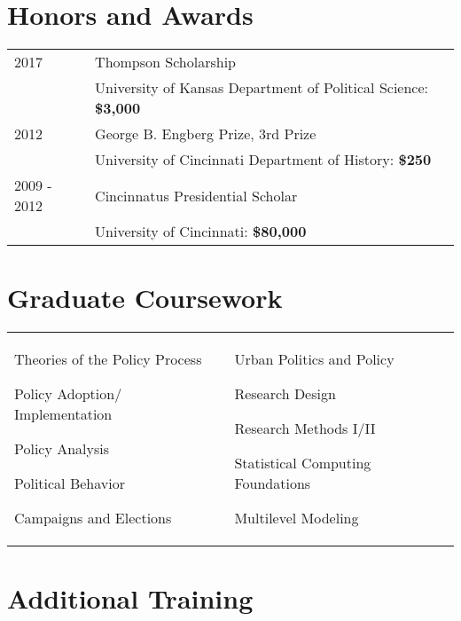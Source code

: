 \documentclass[margin,line,pifont,palatino,courier]{res}
\newenvironment{list1}{
  \begin{list}{\ding{113}}{%
      \setlength{\itemsep}{0in}
      \setlength{\parsep}{0in} \setlength{\parskip}{0in}
      \setlength{\topsep}{0in} \setlength{\partopsep}{0in}
      \setlength{\leftmargin}{0.17in}}}{\end{list}}
\begin{document}
\begin{resume}
\section{\sc Honors and Awards}

\begin{tabular}{@{}p{0.8in}p{4in}}
2017       & Thompson Scholarship\\
           & University of Kansas Department of Political Science: \bf{\$3,000}  \\
2012       & George B. Engberg Prize, 3rd Prize  \\
           & University of Cincinnati Department of History: \bf{\$250}  \\
2009 - 2012 & Cincinnatus Presidential Scholar\\
           & University of Cincinnati: \bf{\$80,000} \\
\end{tabular}

\newpage
\section{\sc Graduate Coursework}

\begin{tabular}{@{}p{2.3in}p{3in}}
\begin{list1}
\item Theories of the Policy Process
\item Policy Adoption/ Implementation
\item Policy Analysis
\item Political Behavior
\item Campaigns and Elections
\end{list1}
&
\begin{list1}
\item Urban Politics and Policy
\item Research Design
\item Research Methods I/II
\item Statistical Computing Foundations
\item Multilevel Modeling
  \end{list1}

\end{tabular}


\section{\sc Additional Training}


\end{resume}
\end{document}
